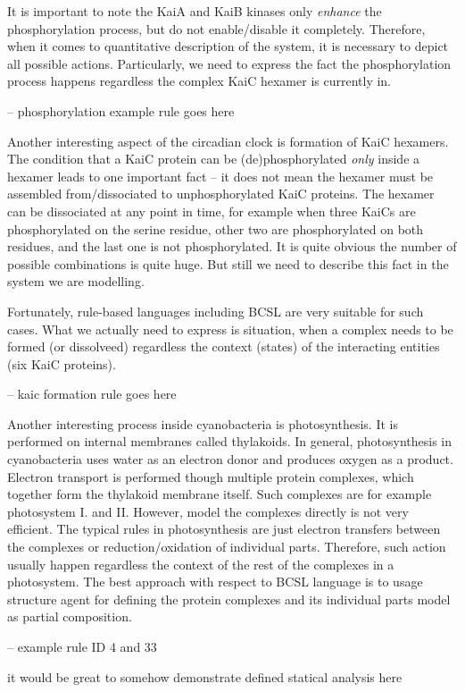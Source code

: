 \documentclass[12pt]{fithesis2}
\begin{document}
It is important to note the KaiA and KaiB kinases only \emph{enhance} the phosphorylation process, but do not enable/disable it completely. Therefore, when it comes to quantitative description of the system, it is necessary to depict all possible actions. Particularly, we need to express the fact the phosphorylation process happens regardless the complex KaiC hexamer is currently in. 

-- phosphorylation example rule goes here

Another interesting aspect of the circadian clock is formation of KaiC hexamers. The condition that a KaiC protein can be (de)phosphorylated \emph{only} inside a hexamer leads to one important fact -- it does not mean the hexamer must be assembled from/dissociated to unphosphorylated KaiC proteins. The hexamer can be dissociated at any point in time, for example when three KaiCs are phosphorylated on the serine residue, other two are phosphorylated on both residues, and the last one is not phosphorylated. It is quite obvious the number of possible combinations is quite huge. But still we need to describe this fact in the system we are modelling.

Fortunately, rule-based languages including BCSL are very suitable for such cases. What we actually need to express is situation, when a complex needs to be formed (or dissolveed) regardless the context (states) of the interacting entities (six KaiC proteins).

-- kaic formation rule goes here

Another interesting process inside cyanobacteria is photosynthesis. It is performed on internal membranes called thylakoids. In general, photosynthesis in cyanobacteria uses water as an electron donor and produces oxygen as a product. Electron transport is performed though multiple protein complexes, which together form the thylakoid membrane itself. Such complexes are for example photosystem I. and II. However, model the complexes directly is not very efficient. The typical rules in photosynthesis are just electron transfers between the complexes or reduction/oxidation of individual parts. Therefore, such action usually happen regardless the context of the rest of the complexes in a photosystem. The best approach with respect to BCSL language is to usage structure agent for defining the protein complexes and its individual parts model as partial composition.

-- example rule ID 4 and 33 

it would be great to somehow demonstrate defined statical analysis here
\end{document}
